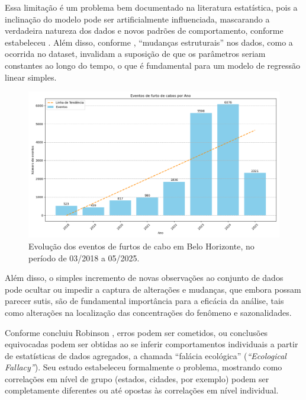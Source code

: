 Essa limitação é um problema bem documentado na literatura estatística, pois a inclinação do modelo pode ser artificialmente influenciada, mascarando a verdadeira natureza dos dados e novos padrões de comportamento, conforme estabeleceu \cite{Anscombe1973}. Além disso, conforme \cite{Gujarati2011}, ``mudanças estruturais'' nos dados, como a ocorrida no dataset, invalidam a suposição de que os parâmetros seriam constantes ao longo do tempo, o que é fundamental para um modelo de regressão linear simples.

\begin{figure}[!htb]
  \captionsetup{singlelinecheck=false}
  \centering
  \includegraphics[scale=0.5,keepaspectratio]{dados/images/grafico_barras_ocorrencias_ano.png}
  \caption{Evolução dos eventos de furtos de cabo em Belo Horizonte, no período de 03/2018 a 05/2025.}
  \label{fig:grafico_barras_ocorrencias_ano}
\end{figure}

Além disso, o simples incremento de novas observações ao conjunto de dados pode ocultar ou impedir a captura de alterações e mudanças, que embora possam parecer sutis, são de fundamental importância para a eficácia da análise, tais como alterações na localização das concentrações do fenômeno e sazonalidades.

Conforme concluiu Robinson \cite{Robinson1950}, erros podem ser cometidos, ou conclusões equivocadas podem ser obtidas ao se inferir comportamentos individuais a partir de estatísticas de dados agregados, a chamada ``falácia ecológica'' (\textit{``Ecological Fallacy''}). Seu estudo estabeleceu formalmente o problema, mostrando como correlações em nível de grupo (estados, cidades, por exemplo) podem ser completamente diferentes ou até opostas às correlações em nível individual.

